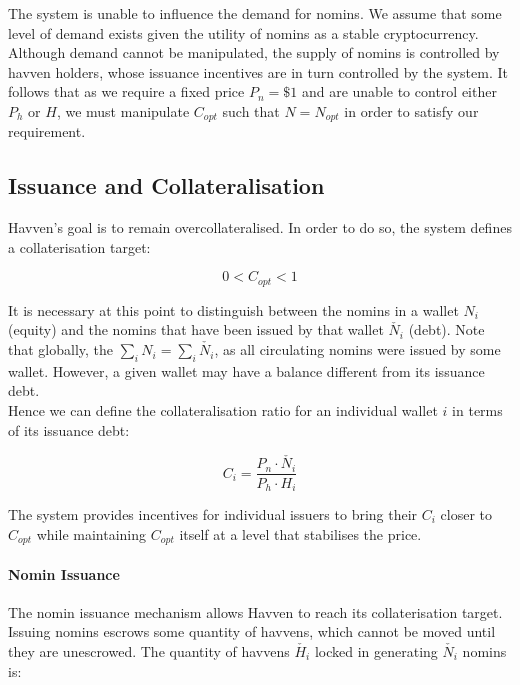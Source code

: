 \noindent The system is unable to influence the demand for nomins. We assume that some level of demand exists given the utility of nomins as a stable cryptocurrency. Although demand cannot be manipulated, the supply of nomins is controlled by havven holders, whose issuance incentives are in turn controlled by the system. It follows that as we require a fixed price $P_n = \$1 $ and are unable to control either $P_h$ or $H$, we must manipulate $C_{opt}$ such that $N = N_{opt}$ in order to satisfy our requirement.

\subsection{Issuance and Collateralisation} 


\noindent Havven's goal is to remain overcollateralised. In order to do so, the system defines a collaterisation target:

$$ 0 < C_{opt} < 1$$

\noindent It is necessary at this point to distinguish between the nomins in a wallet $N_i$ (equity) and the nomins that have been issued by that wallet $\check{N_i}$ (debt). Note that globally, the $\sum_{i}N_i = \sum_{i}\check{N_i}$, as all circulating nomins were issued by some wallet. However, a given wallet may have a balance different from its issuance debt.\\

\noindent Hence we can define the collateralisation ratio for an individual wallet $i$ in terms of its issuance debt:

$$ C_i = \frac{P_n \cdot \check{N_i}}{P_h \cdot H_i}$$

\noindent The system provides incentives for individual issuers to bring their $C_i$ closer to $C_{opt}$ while maintaining $C_{opt}$ itself at a level that stabilises the price.

\paragraph{Nomin Issuance}

\noindent The nomin issuance mechanism allows Havven to reach its collaterisation target. Issuing nomins escrows some quantity of havvens, which cannot be moved until they are unescrowed. The quantity of havvens $\check{H_i}$ locked in generating $\check{N_i}$ nomins is:

